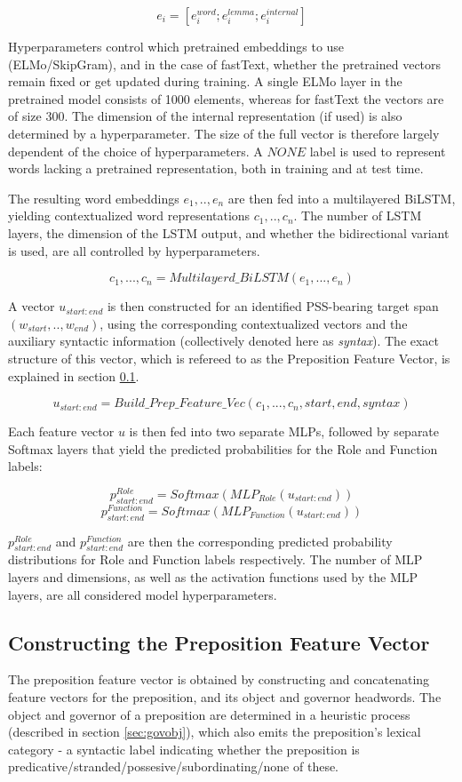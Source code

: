 $$ e_i = [e^{word}_i;e^{lemma}_i;e^{internal}_i] $$

Hyperparameters control which pretrained embeddings to use (ELMo/SkipGram), and in the case of fastText, whether the pretrained vectors remain fixed or get updated during training. A single ELMo layer in the pretrained model consists of 1000 elements, whereas for fastText the vectors are of size 300. The dimension of the internal representation (if used) is also determined by a hyperparameter. The size of the full vector is therefore largely dependent of the choice of hyperparameters. A $NONE$ label is used to represent words lacking a pretrained representation, both in training and at test time.

The resulting word embeddings $e_1, .. ,e_n$ are then fed into a multilayered BiLSTM, yielding contextualized word representations $c_1, .. ,c_n$. The number of LSTM layers, the dimension of the LSTM output, and whether the bidirectional variant is used, are all controlled by hyperparameters.

$$ c_1, ... , c_n = Multilayerd\_BiLSTM(e_1, ... ,e_n)$$

A vector $u_{start:end}$ is then constructed for an identified PSS-bearing target span $(w_{start}, .., w_{end})$, using the corresponding contextualized vectors and the auxiliary syntactic information (collectively denoted here as \emph{syntax}). The exact structure of this vector, which is refereed to as the Preposition Feature Vector, is explained in section \ref{sec:enrichedvec}. 

$$u_{start:end} = Build\_Prep\_Feature\_Vec(c_1, ... ,c_n, start, end, syntax)$$

Each feature vector $u$ is then fed into two separate MLPs, followed by separate Softmax layers that
yield the predicted probabilities for the Role and
Function labels:

$$ p^{Role}_{start:end} = Softmax(MLP_{Role}(u_{start:end})) $$
$$ p^{Function}_{start:end} = Softmax(MLP_{Function}(u_{start:end})) $$

$p^{Role}_{start:end}$ and $p^{Function}_{start:end}$ are then the corresponding predicted probability distributions for Role and Function labels respectively. The number of MLP layers and dimensions, as well as the activation functions used by the MLP layers, are all considered model hyperparameters. 

\subsection{Constructing the Preposition Feature Vector} \label{sec:enrichedvec}
The preposition feature vector is obtained by constructing and concatenating feature vectors for the preposition, and its object and governor headwords. The object and governor of a preposition are determined in a heuristic process (described in section \ref{sec:govobj}), which also emits the preposition's lexical category - a syntactic label indicating whether the preposition is
predicative/stranded/possesive/subordinating/none of these. 

